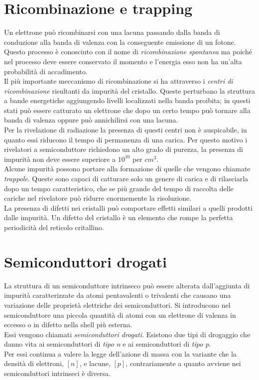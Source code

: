 \documentclass[12pt, letterpaper]{book}
\begin{document}
\section{Ricombinazione e trapping}
Un elettrone può ricombinarsi con una lacuna passando dalla banda di conduzione alla banda di valenza con la conseguente emissione di un fotone. Questo processo è conosciuto con il nome di \textit{ricombinazione spontanea} ma poiché nel processo deve essere conservato il momento e l'energia esso non ha un'alta probabilità di accadimento.\\
Il più importante meccanismo di ricombinazione si ha attraverso i \textit{centri di ricombinazione} risultanti da impurità del cristallo. Queste perturbano la struttura a bande energetiche aggiungendo livelli localizzati nella banda proibita; in questi stati può essere catturato un elettrone che dopo un certo tempo può tornare alla banda di valenza oppure può annichilirsi con una lacuna.\\
Per la rivelazione di radiazione la presenza di questi centri non è auspicabile, in quanto essi riducono il tempo di permanenza di una carica. Per questo motivo i rivelatori a semiconduttore richiedono un alto grado di purezza, la presenza di impurità non deve essere superiore a $10^{10}$ per $cm^3$.\\
Alcune impurità possono portare alla formazione di quelle che vengono chiamate \textit{trappole}. Queste sono capaci di catturare solo un genere di carica e di rilasciarla dopo un tempo caratteristico, che se più grande del tempo di raccolta delle cariche nel rivelatore può ridurre enormemente la risoluzione.\\
La presenza di difetti nei cristalli può comportare effetti similari a quelli prodotti dalle impurità. Un difetto del cristallo è un elemento che rompe la perfetta periodicità del reticolo critallino.

\section{Semiconduttori drogati}
La struttura di un semiconduttore intrinseco può essere alterata dall'aggiunta di impurità caratterizzate da
atomi pentavalenti o trivalenti che causano una variazione delle proprietà elettriche dei semiconduttori. Si introducono nel semiconduttore una piccola quantità di atomi con un elettrone di valenza in eccesso o in difetto nella shell più esterna.\\
Essi vengono chiamati \textit{semiconduttori drogati}. Esistono due tipi di drogaggio che danno vita ai semiconduttori di \textit{tipo n} e ai semiconduttori di \textit{tipo p}.\\
Per essi continua a valere la legge dell'azione di massa con la variante che la densità di elettroni, $[n]$, e lacune, $[p]$, contrariamente a quanto avviene nei semiconduttori intrinseci è diversa.
\end{document}
